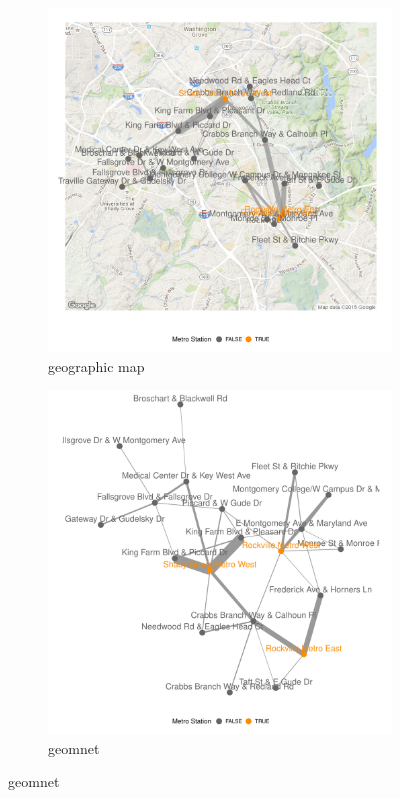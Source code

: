\begin{figure}[hbtp]
\begin{subfigure}[t]{.49\textwidth}
\caption{geographic map}
\includegraphics[width=\textwidth]{figure/geographic_geomnet-1.pdf}
\end{subfigure}
\begin{subfigure}[t]{.49\textwidth}
\caption{geomnet}
\includegraphics[width=\textwidth]{figure/bikes_geom_net-1.pdf}

\end{subfigure}
\end{figure}
